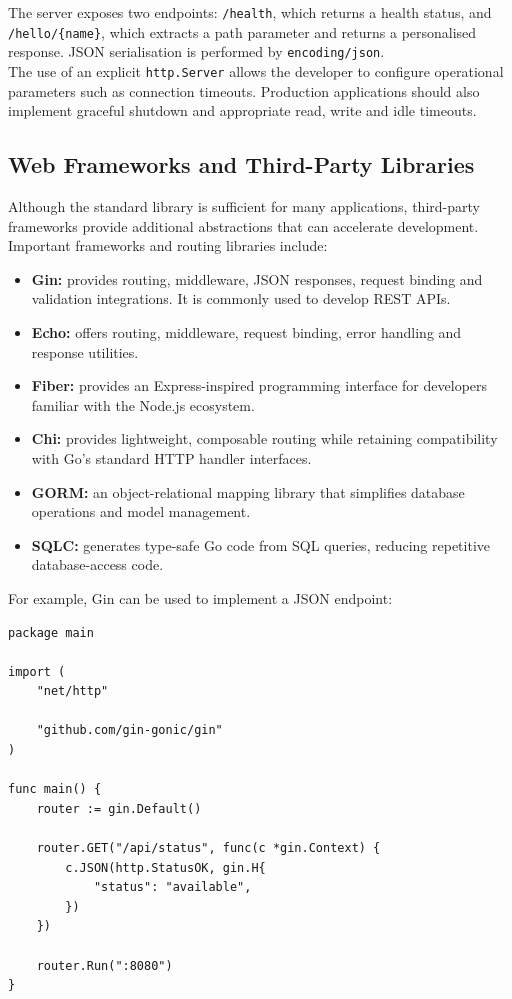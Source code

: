 The server exposes two endpoints: \texttt{/health}, which returns a health status, and \texttt{/hello/\{name\}}, which extracts a path parameter and returns a personalised response. JSON serialisation is performed by \texttt{encoding/json}.\\

The use of an explicit \texttt{http.Server} allows the developer to configure operational parameters such as connection timeouts. Production applications should also implement graceful shutdown and appropriate read, write and idle timeouts.\\

\subsection{Web Frameworks and Third-Party Libraries}

Although the standard library is sufficient for many applications, third-party frameworks provide additional abstractions that can accelerate development.\\

Important frameworks and routing libraries include:

\begin{itemize}
    \item \textbf{Gin:} provides routing, middleware, JSON responses, request binding and validation integrations. It is commonly used to develop REST APIs.
    \item \textbf{Echo:} offers routing, middleware, request binding, error handling and response utilities.
    \item \textbf{Fiber:} provides an Express-inspired programming interface for developers familiar with the Node.js ecosystem.
    \item \textbf{Chi:} provides lightweight, composable routing while retaining compatibility with Go's standard HTTP handler interfaces.
    \item \textbf{GORM:} an object-relational mapping library that simplifies database operations and model management.
    \item \textbf{SQLC:} generates type-safe Go code from SQL queries, reducing repetitive database-access code.
\end{itemize}

For example, Gin can be used to implement a JSON endpoint:

\begin{lstlisting}
package main

import (
    "net/http"

    "github.com/gin-gonic/gin"
)

func main() {
    router := gin.Default()

    router.GET("/api/status", func(c *gin.Context) {
        c.JSON(http.StatusOK, gin.H{
            "status": "available",
        })
    })

    router.Run(":8080")
}
\end{lstlisting}


